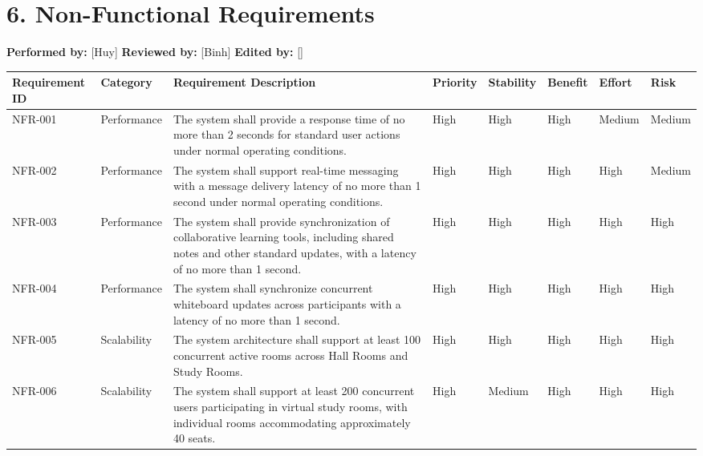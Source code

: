 \documentclass[12pt]{article}
\renewcommand{\baselinestretch}{1.5}
\begin{document}
\section*{6. Non-Functional Requirements}
\par\medskip
\textbf{\textbf{Performed by:}} [Huy] \textbar{} \textbf{\textbf{Reviewed by:}} [Binh] \textbar{} \textbf{\textbf{Edited by:}} []
\par\medskip
\begingroup
\scriptsize
\renewcommand{\baselinestretch}{1.0}\selectfont
\renewcommand{\arraystretch}{1.15}
\setlength{\tabcolsep}{4pt}
\begin{longtable}{|>{\raggedright\arraybackslash}p{}|>{\raggedright\arraybackslash}p{}|>{\raggedright\arraybackslash}p{}|>{\raggedright\arraybackslash}p{}|>{\raggedright\arraybackslash}p{}|>{\raggedright\arraybackslash}p{}|>{\raggedright\arraybackslash}p{}|>{\raggedright\arraybackslash}p{}|}
\hline
Requirement ID & Category & Requirement Description & Priority & Stability & Benefit & Effort & Risk \\ \hline
\endhead
NFR-001 & Performance & The system shall provide a response time of no more than 2 seconds for standard user actions under normal operating conditions. & High & High & High & Medium & Medium \\ \hline
NFR-002 & Performance & The system shall support real-time messaging with a message delivery latency of no more than 1 second under normal operating conditions. & High & High & High & High & Medium \\ \hline
NFR-003 & Performance & The system shall provide synchronization of collaborative learning tools, including shared notes and other standard updates, with a latency of no more than 1 second. & High & High & High & High & High \\ \hline
NFR-004 & Performance & The system shall synchronize concurrent whiteboard updates across participants with a latency of no more than 1 second. & High & High & High & High & High \\ \hline
NFR-005 & Scalability & The system architecture shall support at least 100 concurrent active rooms across Hall Rooms and Study Rooms. & High & High & High & High & High \\ \hline
NFR-006 & Scalability & The system shall support at least 200 concurrent users participating in virtual study rooms, with individual rooms accommodating approximately 40 seats. & High & Medium & High & High & High \\ \hline

\end{longtable}
\end{document}
